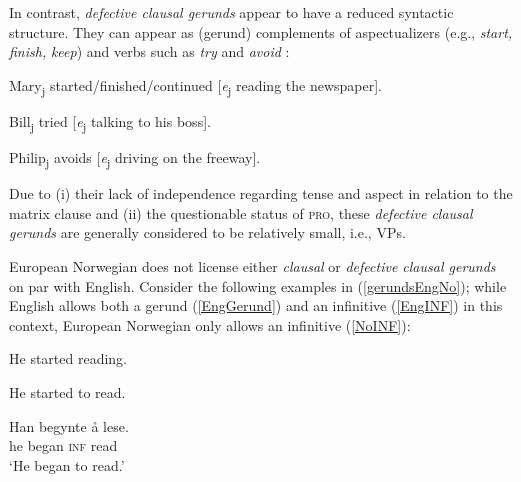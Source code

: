 \documentclass[output=paper,colorlinks,citecolor=brown]{langscibook}
\begin{document}
In contrast, \textit{defective clausal gerunds} appear to have a reduced syntactic structure. They can appear as (gerund) complements of aspectualizers (e.g., \textit{start, finish,} \textit{keep}) and verbs such as \textit{try} and \textit{avoid} %
\citep[70]{pires2007}:

\begin{exe}

\item \label{defectCGEnglish1}

\begin{xlist}

\item Mary\textsubscript{j} started/finished/continued [\textit{e}\textsubscript{j} reading the newspaper]. 
\item Bill\textsubscript{j} tried [\textit{e}\textsubscript{j} talking to his boss].
\item Philip\textsubscript{j} avoids [\textit{e}\textsubscript{j} driving on the freeway].

\end{xlist}


\end{exe}

Due to (i) their lack of independence regarding tense and aspect in relation to the matrix clause and (ii) the questionable status of \textsc{pro}, these  \textit{defective clausal gerunds} are generally considered to be relatively small, i.e., VPs.

European Norwegian does not license either \textit{clausal} or \textit{defective clausal gerunds} on par with English. Consider the following examples in (\ref{gerundsEngNo}); while English allows both a gerund (\ref{EngGerund}) and an infinitive (\ref{EngINF}) in this context, European Norwegian only allows an infinitive (\ref{NoINF}):

\begin{exe} 

\item \label{gerundsEngNo}

\begin{xlist}


\item \label{EngGerund} He started reading. 

\item \label{EngINF} He started to read. 
         
\item \label{NoINF} \gll Han begynte å lese. \\
                         he began \textsc{inf} read \\
                         \glt `He began to read.' 


\end{xlist}
\end{exe}
\end{document}
